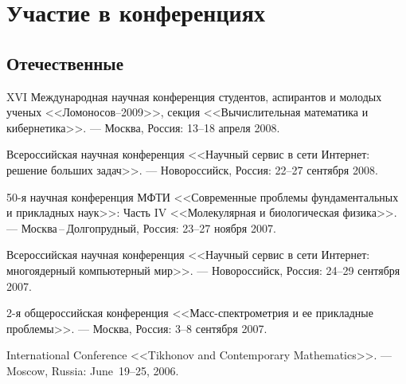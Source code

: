 \documentclass[12pt, a4paper]{article}
\begin{document}
\section*{Участие в конференциях}

\subsection*{Отечественные}
\begin{compactenum}
    \item
        XVI Международная научная конференция студентов, аспирантов и молодых ученых <<Ломоносов--2009>>, секция <<Вычислительная математика и кибернетика>>. ---
        Москва, Россия:
        13--18 апреля 2008.
    \item
        Всероссийская научная конференция <<Научный сервис в сети Интернет: решение больших задач>>. ---
        Новороссийск, Россия:
        22--27 сентября 2008.
    \item
        50-я научная конференция МФТИ <<Современные проблемы фундаментальных и прикладных наук>>: Часть IV <<Молекулярная и биологическая физика>>. ---
        Москва\,--\,Долгопрудный, Россия:
        23--27 ноября 2007.
    \item
        Всероссийская научная конференция <<Научный сервис в сети Интернет: многоядерный компьютерный мир>>. ---
        Новороссийск, Россия:
        24--29 сентября 2007.
    \item
        2-я общероссийская конференция <<Масс-спектрометрия и ее прикладные проблемы>>. ---
        Москва, Россия:
        3--8 сентября 2007.
    \item
        International Conference <<Tikhonov and Contemporary Mathematics>>. ---
        Moscow, Russia:
        June~19--25, 2006.

\end{compactenum}
\end{document}

